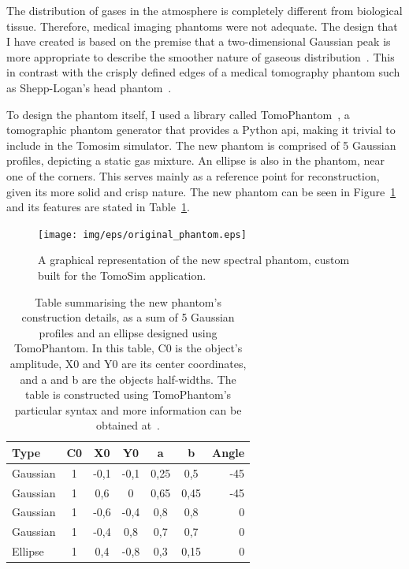 The distribution of gases in the atmosphere is completely different from
biological tissue. Therefore, medical imaging phantoms were not
adequate. The design that I have created is based on the premise that a
two-dimensional Gaussian peak is more appropriate to describe the
smoother nature of gaseous distribution~\cite{Stachniss2009}. This in
contrast with the crisply defined edges of a medical tomography phantom
such as Shepp-Logan's head phantom~\cite{Shepp1974}.

To design the phantom itself, I used a library called
TomoPhantom~\cite{Kazantsev2018}, a tomographic phantom generator that
provides a Python \gls{api}, making it trivial to include in the Tomosim
simulator. The new phantom is comprised of 5 Gaussian profiles,
depicting a static gas mixture. An ellipse is also in the phantom, near
one of the corners. This serves mainly as a reference point for
reconstruction, given its more solid and crisp nature. The new phantom
can be seen in Figure~\ref{fig:new_phantom} and its features are stated
in Table~\ref{tab:new_phantom}.


\begin{figure}[htpb]
    \centering
    \texttt{[image: img/eps/original\_phantom.eps]}
    \caption{A graphical representation of the new spectral phantom,
    custom built for the TomoSim application.}
    \label{fig:new_phantom}
\end{figure}


\begin{table}[htpb]
    \centering
    \caption{Table summarising the new phantom's construction details,
    as a sum of 5 Gaussian profiles and an ellipse designed using
    TomoPhantom. In this table, C0 is the object's amplitude, X0 and Y0
    are its center coordinates, and a and b are the objects half-widths.
    The table is constructed using TomoPhantom's particular syntax and
    more information can be obtained at~\cite{Kazantsev2018}.}
    \label{tab:new_phantom}
    \begin{tabular}{@{}lcccccr@{}}
    \hline
    \textbf{Type} & \textbf{C0} & \textbf{X0} & \textbf{Y0} & \textbf{a}
                  & \textbf{b} & \textbf{\textbf{Angle}} \\ \hline
    Gaussian & 1 & -0,1 & -0,1 & 0,25 & 0,5 & -45 \\
    Gaussian & 1 & 0,6 & 0 & 0,65 & 0,45 & -45 \\
    Gaussian & 1 & -0,6 & -0,4 & 0,8 & 0,8 & 0 \\
    Gaussian & 1 & -0,4 & 0,8 & 0,7 & 0,7 & 0 \\
    Ellipse & 1 & 0,4 & -0,8 & 0,3 & 0,15 & 0 \\ \hline
    \end{tabular}
\end{table}

